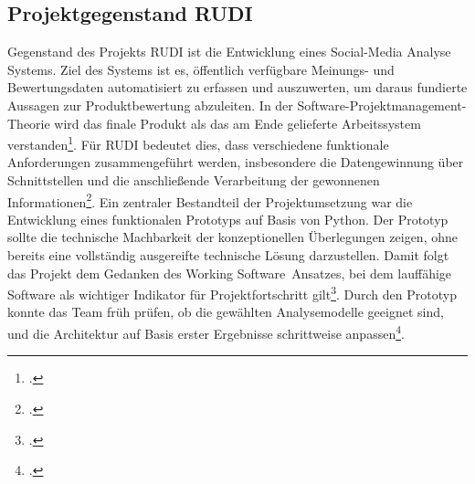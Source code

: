 \documentclass[12pt]{article}
\begin{document}
\subsection{Projektgegenstand RUDI}
Gegenstand des Projekts RUDI ist die Entwicklung eines Social-Media Analyse Systems. 
Ziel des Systems ist es, öffentlich verfügbare Meinungs- und Bewertungsdaten 
automatisiert zu erfassen und auszuwerten, um daraus fundierte Aussagen zur 
Produktbewertung abzuleiten. In der Software-Projektmanagement-Theorie wird das 
finale Produkt als das am Ende gelieferte Arbeitssystem verstanden\footcite[Vgl.][2--3]{couto-2022}. 
Für RUDI bedeutet dies, dass verschiedene funktionale Anforderungen zusammengeführt 
werden, insbesondere die Datengewinnung über Schnittstellen und die anschließende 
Verarbeitung der gewonnenen Informationen\footcite[Vgl.][9--10]{alzahrani-2025}. 
Ein zentraler Bestandteil der Projektumsetzung war die Entwicklung eines funktionalen 
Prototyps auf Basis von Python. Der Prototyp sollte die technische Machbarkeit der 
konzeptionellen Überlegungen zeigen, ohne bereits eine vollständig ausgereifte 
technische Lösung darzustellen. Damit folgt das Projekt dem Gedanken des 
\glqq Working Software\grqq\ Ansatzes, bei dem lauffähige Software als wichtiger 
Indikator für Projektfortschritt gilt\footcite[Vgl.][838--840]{rathor-2024}. 
Durch den Prototyp konnte das Team früh prüfen, ob die gewählten Analysemodelle 
geeignet sind, und die Architektur auf Basis erster Ergebnisse schrittweise 
anpassen\footcite[Vgl.][301]{bagiu-2022}.
\end{document}
